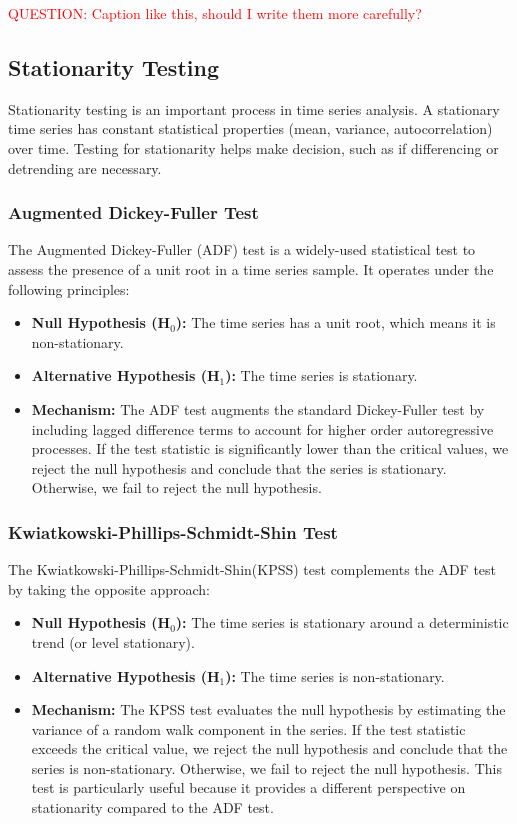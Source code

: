 \textcolor{red}{QUESTION: Caption like this, should I write them more carefully?}

\subsection{Stationarity Testing}
Stationarity testing is an important process in time series analysis.
A stationary time series has constant statistical properties (mean, variance, autocorrelation) over time.
Testing for stationarity helps make decision, such as if differencing or detrending are necessary.

\subsubsection{Augmented Dickey-Fuller Test}
The Augmented Dickey-Fuller (ADF) test is a widely-used statistical test to assess the presence of a unit root in a time series sample.
It operates under the following principles:
\begin{itemize}
    \item \textbf{Null Hypothesis (H\(_0\)):} The time series has a unit root, which means it is non-stationary.
    \item \textbf{Alternative Hypothesis (H\(_1\)):} The time series is stationary.
    \item \textbf{Mechanism:} The ADF test augments the standard Dickey-Fuller test by including lagged difference terms to account for higher order autoregressive processes.
    If the test statistic is significantly lower than the critical values, we reject the null hypothesis and conclude that the series is stationary.
    Otherwise, we fail to reject the null hypothesis.
\end{itemize}

\subsubsection{Kwiatkowski-Phillips-Schmidt-Shin Test}
The Kwiatkowski-Phillips-Schmidt-Shin(KPSS) test complements the ADF test by taking the opposite approach:
\begin{itemize}
    \item \textbf{Null Hypothesis (H\(_0\)):} The time series is stationary around a deterministic trend (or level stationary).
    \item \textbf{Alternative Hypothesis (H\(_1\)):} The time series is non-stationary.
    \item \textbf{Mechanism:} The KPSS test evaluates the null hypothesis by estimating the variance of a random walk component in the series.
    If the test statistic exceeds the critical value, we reject the null hypothesis and conclude that the series is non-stationary.
    Otherwise, we fail to reject the null hypothesis.
    This test is particularly useful because it provides a different perspective on stationarity compared to the ADF test.
\end{itemize}
